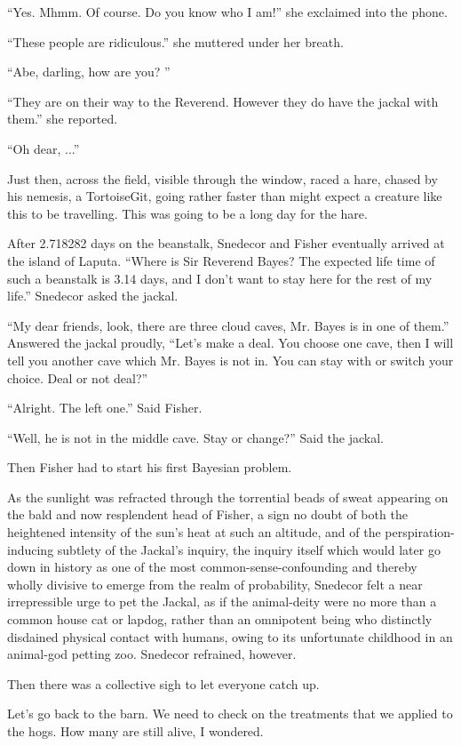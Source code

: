 \documentclass{article}
\begin{document}
``Yes. Mhmm. Of course. Do you know who I am!'' she exclaimed into the phone. 

``These people are ridiculous.'' she muttered under her breath. 

``Abe, darling, how are you? ''

``They are on their way to the Reverend. However they do have the jackal with them.'' she reported.

``Oh dear, ...''

Just then, across the field, visible through the window, raced a hare, chased by his nemesis, a TortoiseGit, going rather faster than might expect a creature like this to be travelling. This was going to be a long day for the hare.

After 2.718282 days on the beanstalk, Snedecor and Fisher eventually arrived at the island of Laputa. 
``Where is Sir Reverend Bayes? The expected life time of such a beanstalk is 3.14 days, 
and I don't want to stay here for the rest of my life.'' Snedecor asked the jackal.

``My dear friends, look, there are three cloud caves, Mr. Bayes is in one of them.'' Answered the jackal proudly,
``Let's make a deal. You choose one cave, then I will tell you another cave which Mr. Bayes is not in.
You can stay with or switch your choice. Deal or not deal?''

``Alright. The left one.'' Said Fisher.

``Well, he is not in the middle cave. Stay or change?'' Said the jackal.

Then Fisher had to start his first Bayesian problem.

As the sunlight was refracted through the torrential beads of sweat appearing on the bald and now resplendent head of Fisher, a sign no doubt of both the heightened intensity of the sun's heat at such an altitude, and of the perspiration-inducing subtlety of the Jackal's inquiry, the inquiry itself which would later go down in history as one of the most common-sense-confounding and thereby wholly divisive to emerge from the realm of probability, Snedecor felt a near irrepressible urge to pet the Jackal, as if the animal-deity were no more than a common house cat or lapdog, rather than an omnipotent being who distinctly disdained physical contact with humans, owing to its unfortunate childhood in an animal-god petting zoo.  Snedecor refrained, however.

Then there was a collective sigh to let everyone catch up.

Let's go back to the barn.  We need to check on the treatments that we applied to the hogs.  How many are still alive, I wondered.
\end{document}
